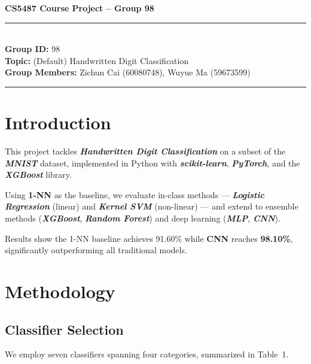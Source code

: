 \documentclass[11pt,a4paper]{article}
\begin{document}
\begin{center}
    {\LARGE \textbf{CS5487 Course Project -- Group 98}} \\
\end{center}

\noindent
\rule{\linewidth}{0.8pt}\\
\textbf{Group ID:} 98 \\
\textbf{Topic:} (Default) Handwritten Digit Classification \\
\textbf{Group Members:} Zichun Cai (60080748), Wuyue Ma (59673599) \\
\rule{\linewidth}{0.8pt} %
\vspace{1.5em}

\section{Introduction}
This project tackles \textbf{\textit{Handwritten Digit Classification}} on a subset of the \textbf{\textit{MNIST}} dataset, implemented in Python with \textbf{\textit{scikit-learn}}, \textbf{\textit{PyTorch}}, and the \textbf{\textit{XGBoost}} library.

Using \textbf{1-NN} as the baseline, we evaluate in-class methods — \textbf{\textit{Logistic Regression}} (linear) and \textbf{\textit{Kernel SVM}} (non-linear) — and extend to ensemble methods (\textbf{\textit{XGBoost}}, \textbf{\textit{Random Forest}}) and deep learning (\textbf{\textit{MLP}}, \textbf{\textit{CNN}}).

Results show the 1-NN baseline achieves 91.60\% while \textbf{CNN} reaches \textbf{98.10\%}, significantly outperforming all traditional models.

\section{Methodology}

\subsection{Classifier Selection}
We employ seven classifiers spanning four categories, summarized in Table~1.
\end{document}
